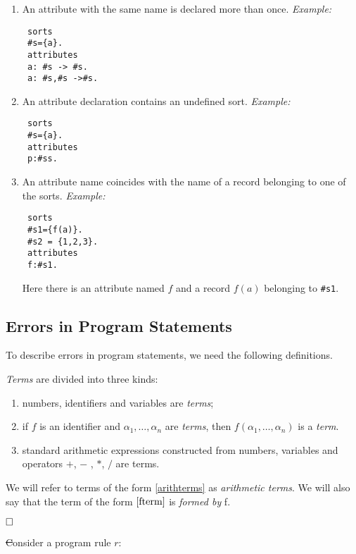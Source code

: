 \documentclass[12pt, letterpaper]{article}
\begin{document}
\begin{enumerate}
\item An attribute with the same name is declared more than once.
\textit{Example:}
\begin{verbatim}
 sorts
 #s={a}.
 attributes
 a: #s -> #s.
 a: #s,#s ->#s.
\end{verbatim}
\item An attribute declaration contains an undefined sort.
\textit{Example:}
\begin{verbatim}
 sorts
 #s={a}.
 attributes
 p:#ss.
\end{verbatim}

\item An attribute name coincides with the name of a record belonging to one of the sorts.
\textit{Example:}
\begin{verbatim}
 sorts
 #s1={f(a)}.
 #s2 = {1,2,3}.
 attributes
 f:#s1.
\end{verbatim}
Here there is an attribute named $f$ and a record $f(a)$ belonging to \texttt{\#s1}.
\end{enumerate}
\subsection{Errors in Program Statements}\label{errorsinstatements}

To describe errors in program statements, we need the following definitions.

\begin{definition}[Term]
{\rm \textit{Terms} are divided into three kinds:
\begin{enumerate}[label=(\arabic*),itemsep=5pt]
 \item numbers, identifiers and variables are \textit{terms};
 \item\label{fterm} if $f$ is an identifier and $\alpha_1, \dots, \alpha_n$ are \textit{terms}, 
   then $f(\alpha_1,\dots, \alpha_n)$ is a \textit{term}.
 \item\label{arithterms} standard arithmetic expressions constructed from numbers, variables and operators $+$, $-$ , $*$, $/$ are terms. 
\end{enumerate}
\noindent
We will refer to terms of the form \ref{arithterms} as \textit{arithmetic terms}.
We will also say that the term of the form $\ref{fterm}$ is \textit{formed by} f. 

$\hfill \Box$
}
\end{definition}

\st
Consider a program rule $r$:
  
\end{document}
